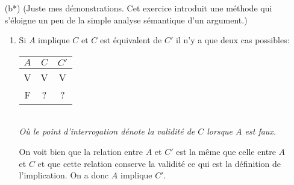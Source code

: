 \documentclass[fleqn,a4paper,nobib]{tufte-handout}
\begin{document}
\begin{enumerate}[label=(\alph*)]
\begin{enumerate}[label=(\arabic*)]
{        proposition vraie ne peut les rendre inconsistentes.} \textbf{Faux.}
        Si on a des propositions de la forme \textit{A est I. A est J.} On peut les
        rendre incompatible avec l'introduction de \textit{A est soit I soit J.} comme
        vraie.
        \item \textit{Si des propositions sont inconsistentes entre elles, alors
        on ne peut les rendre consistentes par l'ajout d'un nouveau prémisse.}
        \textbf{Vrai.} Avec l'exemple précédent, si on introduit \textit{A peut être à
        la fois I et J}, il y a quand même incompatibilité entre \textit{A est I soit J}
        et \textit{A est I} et \textit{A est J}.
        \item \textit{Si des propositions sont compatibles, leur négation le sont aussi.}
        \textit{Faux.} \textit{A est I. A est J. A est soit I soit J.} Les négations des
        deux premières propositions sont incompatibles.
        \item \textit{Si des propositions sont inconsistentes entre elles, alors on peut
        sélectionner n'importe laquelle et argumenter qu'elle est invalide si les autres
        propositions sont vraies.} \textbf{Faux.} Les autres propositions sont peut être
        incompatibles entre elles.
    \end{enumerate}
    \item[(b*)] (Juste mes démonstrations. Cet exercice introduit une méthode qui s'éloigne
    un peu de la simple analyse sémantique d'un argument.)
    \begin{enumerate}[label=(\arabic*)]
        \item Si $A$ implique $C$ et $C$ est équivalent de $C'$ il n'y a que deux cas possibles: \\
            \begin{tabular}{|c|c|c|}
                \hline
                $A$ & $C$ & $C'$ \\
                \hline
                V & V & V \\
                F & ? & ? \\
                \hline
            \end{tabular} \\
            \textit{Où le point d'interrogation dénote la validité de $C$ lorsque $A$ est faux.}

            On voit bien que la relation entre $A$ et $C'$ est la même
            que celle entre $A$ et $C$ et que cette relation conserve
            la validité ce qui est la définition de l'implication.
            On a donc $A$ implique $C'$.


\end{enumerate}
\end{enumerate}
\end{document}

